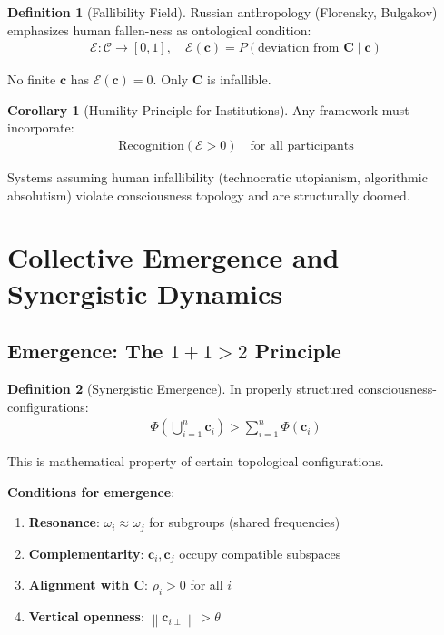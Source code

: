 \documentclass[11pt,a4paper]{article}
\theoremstyle{definition}
\newtheorem{definition}{Definition}[section]
\newtheorem{corollary}{Corollary}[section]
\theoremstyle{remark}
\newcommand{\CC}{\mathcal{C}}
\newcommand{\cc}{\mathbf{c}}
\newcommand{\norm}[1]{\left\|#1\right\|}
\begin{document}
\begin{definition}[Fallibility Field]
Russian anthropology (Florensky, Bulgakov) emphasizes human fallen-ness as ontological condition:
\begin{align}
\mathcal{E}: \CC \to [0,1], \quad \mathcal{E}(\cc) = P(\text{deviation from } \mathbf{C} \mid \cc)
\end{align}

No finite \(\cc\) has \(\mathcal{E}(\cc) = 0\). Only \(\mathbf{C}\) is infallible.
\end{definition}

\begin{corollary}[Humility Principle for Institutions]
Any framework must incorporate:
\begin{align}
\text{Recognition}(\mathcal{E} > 0) \quad \text{for all participants}
\end{align}

Systems assuming human infallibility (technocratic utopianism, algorithmic absolutism) violate consciousness topology and are structurally doomed.
\end{corollary}

\section{Collective Emergence and Synergistic Dynamics}

\subsection{Emergence: The \(1+1 > 2\) Principle}

\begin{definition}[Synergistic Emergence]
In properly structured consciousness-configurations:
\begin{align}
\Phi\left(\bigcup_{i=1}^n \cc_i\right) > \sum_{i=1}^n \Phi(\cc_i)
\end{align}

This is mathematical property of certain topological configurations.

\textbf{Conditions for emergence}:
\begin{enumerate}
\item \textbf{Resonance}: \(\omega_i \approx \omega_j\) for subgroups (shared frequencies)
\item \textbf{Complementarity}: \(\cc_i, \cc_j\) occupy compatible subspaces
\item \textbf{Alignment with \(\mathbf{C}\)}: \(\rho_i > 0\) for all \(i\)
\item \textbf{Vertical openness}: \(\norm{\cc_{i\perp}} > \theta\)
\end{enumerate}
\end{definition}
\end{document}
